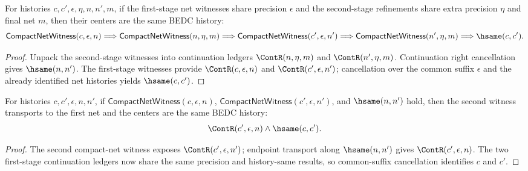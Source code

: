 \begin{theorem}
\label{thm:compact-net-witness-composite-center-deterministic}
For histories $c,c',\epsilon,\eta,n,n',m$, if the first-stage net witnesses
share precision $\epsilon$ and the second-stage refinements share extra
precision $\eta$ and final net $m$, then their centers are the same BEDC
history:
$$
\mathsf{CompactNetWitness}(c,\epsilon,n)
\Longrightarrow
\mathsf{CompactNetWitness}(n,\eta,m)
\Longrightarrow
\mathsf{CompactNetWitness}(c',\epsilon,n')
\Longrightarrow
\mathsf{CompactNetWitness}(n',\eta,m)
\Longrightarrow
\hsame(c,c').
$$
\end{theorem}
\begin{proof}
Unpack the second-stage witnesses into continuation ledgers
$\ContR(n,\eta,m)$ and $\ContR(n',\eta,m)$. Continuation right cancellation
gives $\hsame(n,n')$. The first-stage witnesses provide
$\ContR(c,\epsilon,n)$ and $\ContR(c',\epsilon,n')$; cancellation over the
common suffix $\epsilon$ and the already identified net histories yields
$\hsame(c,c')$.
\end{proof}

\begin{theorem}
\label{thm:compact-net-witness-common-precision-center-transport}
For histories $c,c',\epsilon,n,n'$, if
$\mathsf{CompactNetWitness}(c,\epsilon,n)$,
$\mathsf{CompactNetWitness}(c',\epsilon,n')$, and $\hsame(n,n')$ hold, then
the second witness transports to the first net and the centers are the same
BEDC history:
$$
\ContR(c',\epsilon,n)\land \hsame(c,c').
$$
\end{theorem}
\begin{proof}
The second compact-net witness exposes $\ContR(c',\epsilon,n')$; endpoint
transport along $\hsame(n,n')$ gives $\ContR(c',\epsilon,n)$. The two
first-stage continuation ledgers now share the same precision and history-same
results, so common-suffix cancellation identifies $c$ and $c'$.
\end{proof}

